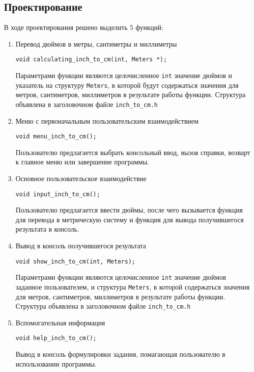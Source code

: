 \documentclass[12pt,a4paper]{report}
\begin{document}
\subsection{Проектирование}
\hspace{\parindent}В ходе проектирования решено выделить 5 функций:
\begin{enumerate}
 	\item Перевод дюймов в метры, сантиметры и миллиметры
 	
 	\verb+void calculating_inch_to_cm(int, Meters *);+
 	
	Параметрами функции являются целочисленное \verb+int+ значение дюймов и указатель на структуру \verb+Meters+, в которой будут содержаться значения для метров, сантиметров, миллиметров в результате работы функции.
Структура объявлена в заголовочном файле \verb+inch_to_cm.h+		 
		 
		 
	\item Меню с первоначальным пользовательским взаимодействием
	
	\verb+void menu_inch_to_cm();+
	
	Пользователю предлагается выбрать консольный ввод, вызов справки, возварт к главное меню или завершение программы.	
		 
		 
	\item Основное пользовательское взаимодействие
	
	\verb+void input_inch_to_cm();+

	Пользователю предлагается ввести дюймы, после чего вызывается функция для перевода в метрическую систему и функция для вывода получившегося результата в консоль.
	
	
	\item Вывод в консоль получившегося результата
	
	\verb+void show_inch_to_cm(int, Meters);+

	Параметрами функции являются целочисленное \verb+int+ значение дюймов заданное пользователем, и структура \verb+Meters+, в которой содержаться значения для метров, сантиметров, миллиметров в результате работы функции.
Структура объявлена в заголовочном файле \verb+inch_to_cm.h+	
	
	
	\item Вспомогательная информация
	
	\verb+void help_inch_to_cm();+
	
	Вывод в консоль формулировки задания, помагающая пользователю в использовании программы.
\end{enumerate}
\end{document}
